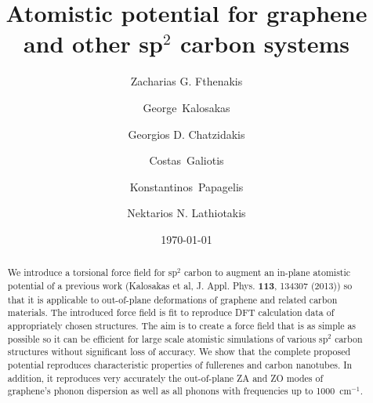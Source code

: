 \documentclass[aps,prb,floatfix,twocolumn,showpacs]{revtex4}
\begin{document}
\title{Atomistic potential for graphene and other sp$^2$ carbon systems}


\author{Zacharias G. Fthenakis}
\author{George~Kalosakas}
\author{Georgios D. Chatzidakis} 
\author{Costas~Galiotis}
\author{Konstantinos~Papagelis}
\author{Nektarios N. Lathiotakis}

\date{\today}
\pacs{}

\begin{abstract}
We introduce a torsional force field for sp$^2$ carbon to augment an
in-plane atomistic potential of a previous work 
(Kalosakas et al, J. Appl. Phys. {\bf 113}, 134307 (2013)) so that it is 
applicable to out-of-plane deformations of graphene and related carbon materials. 
The introduced force field is fit to reproduce DFT calculation data of appropriately 
chosen structures. The aim is to create a force field that is as simple as possible
so it can be efficient for large scale atomistic simulations of various sp$^2$ carbon structures
without significant loss of accuracy. We show that the complete proposed potential reproduces
characteristic properties of fullerenes and carbon nanotubes. 
In addition, it reproduces very accurately the out-of-plane ZA and ZO modes of graphene's 
phonon dispersion as well as all phonons with frequencies up to 1000~cm$^{-1}$.
\end{abstract}
\maketitle
\end{document}
